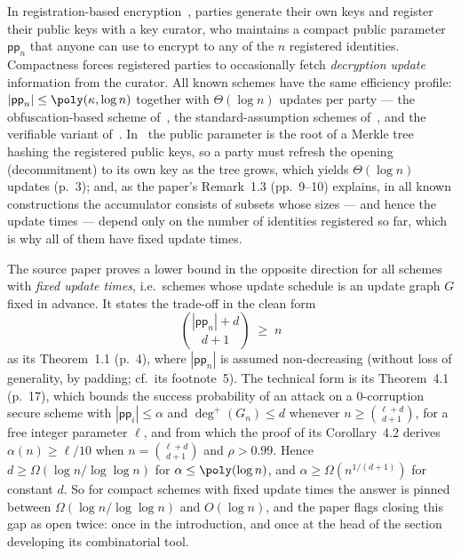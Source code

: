 \documentclass{conjura-conjecture}
\newcommand{\pp}{\mathsf{pp}}
\newcommand{\outdeg}{\deg^{+}}
\begin{document}
In registration-based encryption~\cite{GHMR18}, parties generate their
own keys and register their public keys with a key curator, who
maintains a compact public parameter $\pp_n$ that anyone can use to
encrypt to any of the $n$ registered identities. Compactness forces
registered parties to occasionally fetch \emph{decryption update}
information from the curator. All known schemes have the same efficiency
profile: $|\pp_n| \le \poly(\kappa,\log n)$ together with
$\Theta(\log n)$ updates per party --- the obfuscation-based scheme
of~\cite{GHMR18}, the standard-assumption schemes of~\cite{GHM19}, and
the verifiable variant of~\cite{GV20}. In~\cite{GHMR18} the public
parameter is the root of a Merkle tree hashing the registered public
keys, so a party must refresh the opening (decommitment) to its own key
as the tree grows, which yields $\Theta(\log n)$ updates (p.~3); and, as
the paper's Remark~1.3 (pp.~9--10) explains, in all known constructions
the accumulator consists of subsets whose sizes --- and hence the update
times --- depend only on the number of identities registered so far,
which is why all of them have fixed update times.

The source paper proves a lower bound in the opposite direction for all
schemes with \emph{fixed update times}, i.e.\ schemes whose update
schedule is an update graph $G$ fixed in advance. It states the
trade-off in the clean form
\[
  \binom{|\pp_n| + d}{\,d+1\,} \;\ge\; n
\]
as its Theorem~1.1 (p.~4), where $|\pp_n|$ is assumed non-decreasing
(without loss of generality, by padding; cf.\ its footnote~5). The
technical form is its Theorem~4.1 (p.~17), which bounds the success
probability of an attack on a $0$-corruption secure scheme with
$|\pp_i| \le \alpha$ and $\outdeg(G_n) \le d$ whenever
$n \ge \binom{\ell+d}{d+1}$, for a free integer parameter $\ell$, and
from which the proof of its Corollary~4.2 derives $\alpha(n) \ge \ell/10$
when $n = \binom{\ell+d}{d+1}$ and $\rho > 0.99$. Hence
$d \ge \Omega(\log n/\log\log n)$ for $\alpha \le \poly(\log n)$, and
$\alpha \ge \Omega(n^{1/(d+1)})$ for constant $d$. So for compact
schemes with fixed update times the answer is pinned between
$\Omega(\log n/\log\log n)$ and $O(\log n)$, and the paper flags closing
this gap as open twice: once in the introduction, and once at the head
of the section developing its combinatorial tool.
\end{document}
